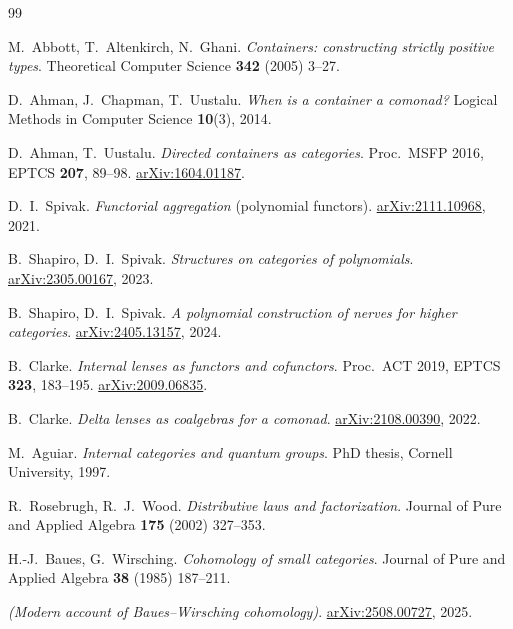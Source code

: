 \documentclass[11pt,a4paper]{book}
\theoremstyle{plain}
\theoremstyle{definition}
\theoremstyle{remark}
\begin{document}
\begin{thebibliography}{99}

 M.~Abbott, T.~Altenkirch, N.~Ghani.
\emph{Containers: constructing strictly positive types}.
Theoretical Computer Science \textbf{342} (2005) 3--27.

 D.~Ahman, J.~Chapman, T.~Uustalu.
\emph{When is a container a comonad?}
Logical Methods in Computer Science \textbf{10}(3), 2014.

 D.~Ahman, T.~Uustalu.
\emph{Directed containers as categories}.
Proc.\ MSFP 2016, EPTCS \textbf{207}, 89--98.
\href{https://arxiv.org/abs/1604.01187}{arXiv:1604.01187}.

 D.~I.~Spivak.
\emph{Functorial aggregation} (polynomial functors).
\href{https://arxiv.org/abs/2111.10968}{arXiv:2111.10968}, 2021.

 B.~Shapiro, D.~I.~Spivak.
\emph{Structures on categories of polynomials}.
\href{https://arxiv.org/abs/2305.00167}{arXiv:2305.00167}, 2023.

 B.~Shapiro, D.~I.~Spivak.
\emph{A polynomial construction of nerves for higher categories}.
\href{https://arxiv.org/abs/2405.13157}{arXiv:2405.13157}, 2024.

 B.~Clarke.
\emph{Internal lenses as functors and cofunctors}.
Proc.\ ACT 2019, EPTCS \textbf{323}, 183--195.
\href{https://arxiv.org/abs/2009.06835}{arXiv:2009.06835}.

 B.~Clarke.
\emph{Delta lenses as coalgebras for a comonad}.
\href{https://arxiv.org/abs/2108.00390}{arXiv:2108.00390}, 2022.

 M.~Aguiar.
\emph{Internal categories and quantum groups}.
PhD thesis, Cornell University, 1997.

 R.~Rosebrugh, R.~J.~Wood.
\emph{Distributive laws and factorization}.
Journal of Pure and Applied Algebra \textbf{175} (2002) 327--353.

 H.-J.~Baues, G.~Wirsching.
\emph{Cohomology of small categories}.
Journal of Pure and Applied Algebra \textbf{38} (1985) 187--211.

 \emph{(Modern account of Baues--Wirsching cohomology)}.
\href{https://arxiv.org/abs/2508.00727}{arXiv:2508.00727}, 2025.

\end{thebibliography}
\end{document}
